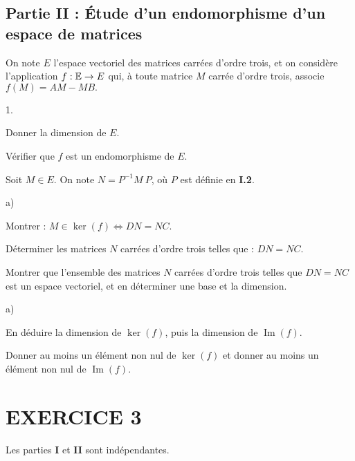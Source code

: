 \documentclass[11pt]{article}%
\begin{document}
\subsection*{Partie II : Étude d'un endomorphisme d'un espace de
matrices}

On note $E$ l'espace vectoriel des matrices carrées d'ordre trois, et
on
considère l'application $f :\mathbb{E}\rightarrow E$ qui, à toute matrice $M$
carrée d'ordre trois, associe $f\left( M\right) = AM-MB.$

\begin{noliste}{1.}
 \setlength{\itemsep}{4mm}
\item Donner la dimension de $E$.

\item Vérifier que $f$ est un endomorphisme de $E$.

\item Soit $M\in E$. On note $N = P^{-1}M~P$, où $P$ est définie en 
\textbf{I.2}.

\begin{noliste}{a)}
 \setlength{\itemsep}{2mm}
\item Montrer : $M\in \ker \left( f\right) \Longleftrightarrow DN =
NC.$

\item Déterminer les matrices $N$ carrées d'ordre trois telles que : 
$DN = NC.$

\item Montrer que l'ensemble des matrices $N$ carrées d'ordre trois
telles que $DN = NC$ est un espace vectoriel, et en déterminer une base
et
la dimension.
\end{noliste}

\item 
\begin{noliste}{a)}
 \setlength{\itemsep}{2mm}
\item En déduire la dimension de $\ker \left( f\right) $, puis la
dimension de $\operatorname{Im}\left( f\right) $.

\item Donner au moins un élément non nul de $\ker \left( f\right) $
et donner au moins un élément non nul de
$\operatorname{Im}(f).$\newpage
\end{noliste}
\end{noliste}

\section*{EXERCICE 3}

Les parties \textbf{I} et \textbf{II} sont indépendantes.
\end{document}

